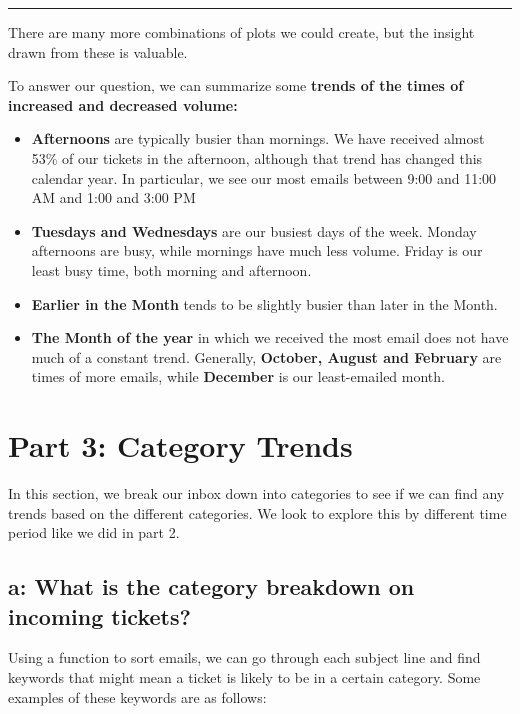 \documentclass[11pt]{article}
\begin{document}
    \begin{center}\rule{0.5\linewidth}{\linethickness}\end{center}

There are many more combinations of plots we could create, but the
insight drawn from these is valuable.

To answer our question, we can summarize some \textbf{trends of the
times of increased and decreased volume:}

\begin{itemize}
\item
  \textbf{Afternoons} are typically busier than mornings. We have
  received almost 53\% of our tickets in the afternoon, although that
  trend has changed this calendar year. In particular, we see our most
  emails between 9:00 and 11:00 AM and 1:00 and 3:00 PM 
\item
  \textbf{Tuesdays and Wednesdays} are our busiest days of the week.
  Monday afternoons are busy, while mornings have much less volume.
  Friday is our least busy time, both morning and afternoon. 
\item
  \textbf{Earlier in the Month} tends to be slightly busier than later
  in the Month. 
\item
  \textbf{The Month of the year} in which we received the most email
  does not have much of a constant trend. Generally, \textbf{October,
  August and February} are times of more emails, while \textbf{December}
  is our least-emailed month.
\end{itemize}

    \hypertarget{part-3-category-trends}{%
\section{Part 3: Category Trends}\label{part-3-category-trends}}

In this section, we break our inbox down into categories to see if we
can find any trends based on the different categories. We look to
explore this by different time period like we did in part 2.

\hypertarget{a-what-is-the-category-breakdown-on-incoming-tickets}{%
\subsection{a: What is the category breakdown on incoming
tickets?}\label{a-what-is-the-category-breakdown-on-incoming-tickets}}

    Using a function to sort emails, we can go through each subject line and
find keywords that might mean a ticket is likely to be in a certain
category. Some examples of these keywords are as follows:
\end{document}
